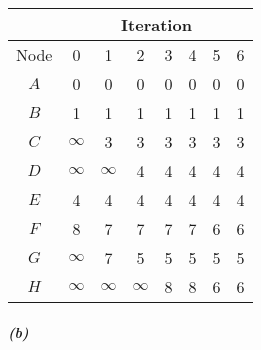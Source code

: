 \documentclass[12pt]{article}
\begin{document}
\begin{center}
\begin{tabular}{ | c | c | c | c | c | c | c | c | }
\hline
& \multicolumn{7}{|c|}{Iteration} \\ \hline
Node & 0 & 1 & 2 & 3 & 4 & 5 & 6 \\ \hline \hline
$A$ & 0 & 0 & 0 & 0 & 0 & 0 & 0 \\ \hline
$B$ & 1 & 1 & 1 & 1 & 1 & 1 & 1 \\ \hline
$C$ & $\infty$ & 3 & 3 & 3 & 3 & 3 & 3 \\ \hline
$D$ & $\infty$ & $\infty$ & 4 & 4 & 4 & 4 & 4\\ \hline
$E$ & 4 & 4 & 4 & 4 & 4 & 4 & 4 \\ \hline
$F$ & 8 & 7 & 7 & 7 & 7 & 6 & 6 \\ \hline
$G$ & $\infty$ & 7 & 5 & 5 & 5 & 5 & 5 \\ \hline
$H$ & $\infty$ & $\infty$ & $\infty$ & 8 & 8 & 6 & 6 \\
\hline
\end{tabular}

\begin{comment}
\begin{tabular}{ | c | c | c | c | c | c | c | c | c | c | }
\hline
Iteration & Node a  & Node b & Node c & Node d & Node e & Node f & Node g & Node h & Set S\\ \hline
0 & 0 & $\infty$ & $\infty$ & $\infty$ & $\infty$ & $\infty$ & $\infty$ & $\infty$ & a\\
1 & 0 & 1 & $\infty$ & $\infty$ & 4 & 8 & $\infty$ & $\infty$ & a,b\\
2 & 0 & 1 & 3 & $\infty$ & 4 & 7 & 7 & $\infty$ & a,b,c\\
3 & 0 & 1 & 3 & 4 & 4 & 7 & 5 & $\infty$ & a,b,c,d\\
4 & 0 & 1 & 3 & 4 & 4 & 7 & 5 & 8 & a,b,c,d,e\\
5 & 0 & 1 & 3 & 4 & 4 & 6 & 5 & 6 & a,b,c,d,e,g\\
6 & 0 & 1 & 3 & 4 & 4 & 6 & 5 & 6 & a,b,c,d,e,f,g\\
7 & 0 & 1 & 3 & 4 & 4 & 6 & 5 & 6 & a,b,c,d,e,f,g,h\\
\hline
\end{tabular}
\end{comment}

\end{center}

\subparagraph{(b)}
\end{document}
